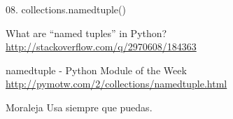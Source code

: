 \begin{frame}{08. collections.namedtuple()}
  \small
  \begin{block}
    {\centering What are ``named tuples'' in Python?}
    \centering
    \url{http://stackoverflow.com/q/2970608/184363}
  \end{block}

  \begin{block}
    {\centering namedtuple - Python Module of the Week}
    \centering
    \url{http://pymotw.com/2/collections/namedtuple.html}
  \end{block}

  \vspace{0.5cm}
  {
    \normalsize
    \begin{alertblock}{\centering Moraleja}
      \centering
      Usa  siempre que puedas.
    \end{alertblock}
  }
\end{frame}
